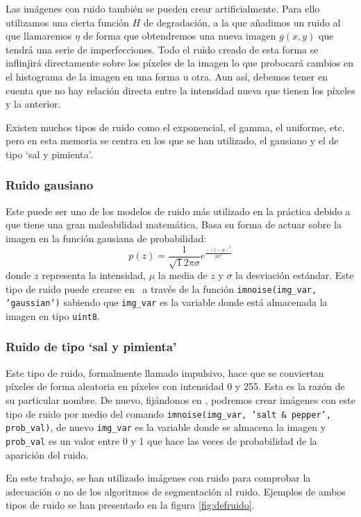 Las imágenes con ruido también se pueden crear artificialmente. Para ello utilizamos una cierta función $H$ de degradación, a la que añadimos un ruido al que llamaremos $\eta$ de forma que obtendremos una nueva imagen $g(x,y)$ que tendrá una serie de imperfecciones. Todo el ruido creado de esta forma se inflinjirá directamente sobre los píxeles de la imagen lo que probocará cambios en el histograma de la imagen en una forma u otra. Aun así, debemos tener en cuenta que no hay relación directa entre la intensidad nueva que tienen los píxeles y la anterior. 

Existen muchos tipos de ruido como el exponencial, el gamma, el uniforme, etc. pero en esta memoria se centra en los que se han utilizado, el gausiano y el de tipo `sal y pimienta'.

\subsubsection{Ruido gausiano}
Este puede ser uno de los modelos de ruido más utilizado en la práctica debido a que tiene una gran maleabilidad matemática. Basa su forma de actuar sobre la imagen en la función gausiana de probabilidad:
$$p(z) = \frac{1}{\sqrt{1}{2\pi\sigma}} e^\frac{-(z-\mu)^2}{2\sigma^2}$$
donde $z$ representa la intensidad, $\mu$ la media de $z$ y $\sigma$ la desviación estándar. Este tipo de ruido puede crearse en \MATLAB\ a través de la función \texttt{imnoise(img_var, 'gaussian')} sabiendo que \texttt{img_var} es la variable donde está almacenada la imagen en tipo \texttt{uint8}.

\subsubsection{Ruido de tipo `sal y pimienta'}
Este tipo de ruido, formalmente llamado impulsivo, hace que se conviertan píxeles de forma aleatoria en píxeles con intensidad 0 y 255. Esta es la razón de su particular nombre. De nuevo, fijándonos en \MATLAB, podremos crear imágenes con este tipo de ruido por medio del comando \texttt{imnoise(img_var, 'salt & pepper', prob_val)}, de nuevo \texttt{img_var} es la variable donde se almacena la imagen y \texttt{prob_val} es un valor entre 0 y 1 que hace las veces de probabilidad de la aparición del ruido. 

En este trabajo, se han utilizado imágenes con ruido para comprobar la adecuación o no de los algoritmos de segmentación al ruido. Ejemplos de ambos tipos de ruido se han presentado en la figura \ref{fig:defruido}.